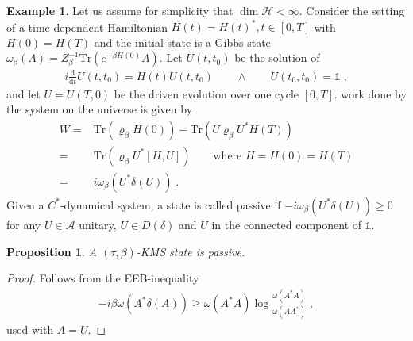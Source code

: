 \documentclass[
a4paper, %
11pt, %
onecolumn, %
openany, %
]{memoir}
\theoremstyle{definition}
\newtheorem{example}[definition]{Example}
\theoremstyle{remark}
\theoremstyle{plain}
\newtheorem{prop}[definition]{Proposition}
\begin{document}
\begin{example}
Let us assume for simplicity that $\dim \mathcal{H}<\infty$. Consider the setting of a time-dependent Hamiltonian $H(t)=H(t)^*, t\in[0,T]$ with $H(0)=H(T)$ and the initial state is a Gibbs state $\omega_{\beta}(A)=Z_{\beta}^{-1}\mathrm{Tr}(e^{-\beta H(0)}A)$. Let $U(t,t_0)$ be the solution of \begin{align}
i\frac{\mathrm{d}}{\mathrm{d}t}U(t,t_0)=H(t)U(t,t_0) \qquad \land \qquad U(t_0,t_0)=\mathds{1}\; ,
\end{align}
and let $U=U(T,0)$ be the driven evolution over one cycle $[0,T]$. work done by the system on the universe is given by \begin{align}
W=&\mathrm{Tr}(\varrho_{\beta}H(0))-\mathrm{Tr}(U\varrho_{\beta}U^*H(T))\\
=& \mathrm{Tr}(\varrho_{\beta}U^*[H,U]) \qquad \text{where }H=H(0)=H(T)\\
=& i\omega_{\beta}(U^*\delta(U))\; .
\end{align}
Given a $C^*$-dynamical system, a state is called passive if $-i\omega_{\beta}(U^*\delta(U))\geq 0$ for any $U\in\mathcal{A}$ unitary, $U\in D(\delta)$ and $U$ in the connected component of $\mathds{1}$.\end{example}
\begin{prop}
A $(\tau,\beta)$-KMS state is passive.
\end{prop}
\begin{proof}
Follows from the EEB-inequality \begin{align}
-i\beta\omega(A^*\delta(A))\geq \omega(A^*A)\log\frac{\omega(A^*A)}{\omega(AA^*)}\; ,
\end{align}
used with $A=U$.\end{proof}
\end{document}
